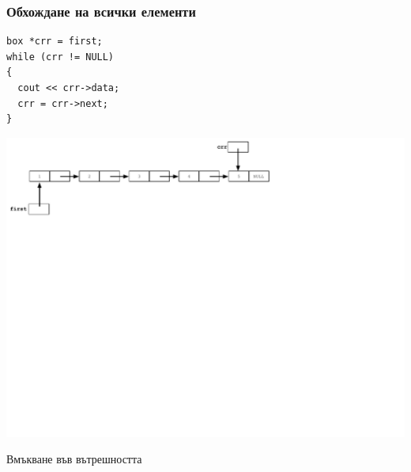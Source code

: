 \documentclass{beamer}
\begin{document}
\begin{frame}[fragile]
\frametitle{Обхождане на всички елементи}

\begin{flushleft}
\begin{lstlisting}
box *crr = first;
while (crr != NULL)
{
  cout << crr->data;
  crr = crr->next;
}
\end{lstlisting}  
\end{flushleft}


\includegraphics[width=14.0cm]{images/04_ll_trav_eol}

\end{frame}


\begin{frame}
\centerline{Вмъкване във вътрешността}
\end{frame}
\end{document}
